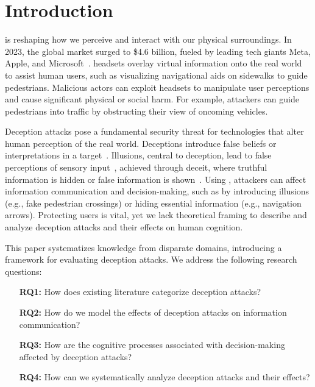 \section{Introduction}

\MR is reshaping how we perceive and interact with our physical surroundings.
In 2023, the global \MR market surged to \$4.6 billion, fueled by leading tech giants Meta, Apple, and Microsoft~\cite{mr-market}. 
\MR headsets overlay virtual information onto the real world to assist human users, such as visualizing navigational aids on sidewalks to guide pedestrians.  
Malicious actors can exploit \MR headsets to manipulate user perceptions and cause significant physical or social harm. 
For example, attackers can guide pedestrians into traffic by obstructing their view of oncoming vehicles. 

Deception attacks pose a fundamental security threat for technologies that alter human perception of the real world.
Deceptions introduce false beliefs or interpretations in a target~\cite{hyman1989psychology}. 
Illusions, central to deception, lead to false perceptions of sensory input~\cite{jastrow1900psychology}, achieved through deceit, where truthful information is hidden or false information is shown~\cite{adar2013benevolent}. 
Using \MR, attackers can affect information communication and decision-making, such as by introducing illusions (e.g., fake pedestrian crossings) or hiding essential information (e.g., navigation arrows).
Protecting \MR users is vital, yet we lack theoretical framing to describe and analyze \MR deception attacks and their effects on human cognition. %

This paper systematizes knowledge from disparate domains, introducing a framework for evaluating %
\MR deception attacks. We address the following research questions:

\begin{itemize}[labelsep=0.1cm,leftmargin=*,labelindent=1cm]
\itemsep0em 

    \item[\textbf{RQ1:}] How does existing literature categorize \MR deception attacks? %
    \item[\textbf{RQ2:}] How do we model the effects of \MR deception attacks on information communication?
    \item [\textbf{RQ3:}] How are the cognitive processes associated with decision-making affected by \MR deception attacks?
    \item [\textbf{RQ4:}] How can we systematically analyze \MR deception attacks and their effects? %
\end{itemize}


